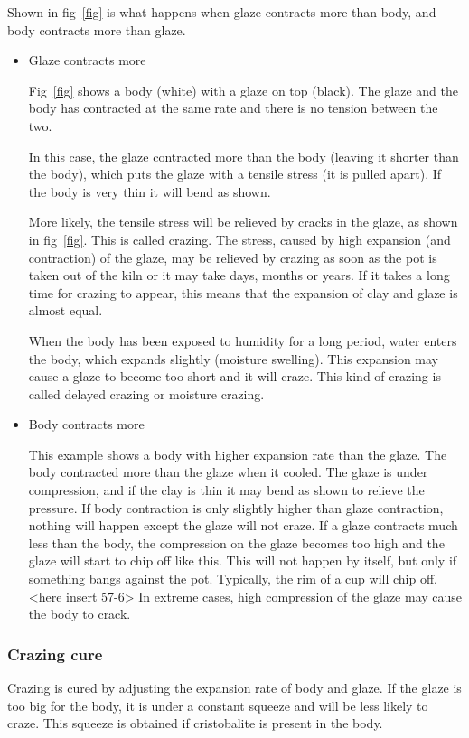 Shown in fig~\ref{fig} is what happens when glaze contracts more than body, and 
body contracts more than glaze.
\begin{itemize}
\item Glaze contracts more

Fig~\ref{fig} shows a body (white) with a glaze on top (black). The glaze and 
the body has contracted at the same rate and there is no tension between the 
two.
 
In this case, the glaze contracted more than the body (leaving it shorter than 
the body), which puts the glaze with a tensile stress (it is pulled apart). If 
the body is very thin it will bend as shown.

More likely, the tensile stress will be relieved by cracks in the glaze, as 
shown in fig~\ref{fig}. This is called crazing. The stress, caused by high 
expansion (and contraction) of the glaze, may be relieved by crazing as soon as 
the pot is taken out of the kiln or it may take days, months or years. If it 
takes a long time for crazing to appear, this means that the expansion of clay 
and glaze is almost equal.

When the body has been exposed to humidity for a long period, water enters the 
body, which expands slightly (moisture swelling). This expansion may cause a 
glaze to become too short and it will craze. This kind of crazing is called 
delayed crazing or moisture crazing.

\item Body contracts more

This example shows a body with higher expansion rate than the glaze. The body 
contracted more than the glaze when it cooled. The glaze is under compression, 
and if the clay is thin it may bend as shown to relieve the pressure. If body 
contraction is only slightly higher than glaze contraction, nothing will happen 
except the glaze will not craze. If a glaze contracts much less than the body, 
the compression on the glaze becomes too high and the glaze will start to chip 
off like this. This will not happen by itself, but only if something bangs 
against the pot. Typically, the rim of a cup will chip off. <here insert 57-6> 
In extreme cases, high compression of the glaze may cause the body to crack.
\end{itemize}
\subsubsection{Crazing cure}
Crazing is cured by adjusting the expansion rate of body and glaze. If the 
glaze is too big for the body, it is under a constant squeeze and will be less 
likely to craze. This squeeze is obtained if cristobalite is present in the 
body.
